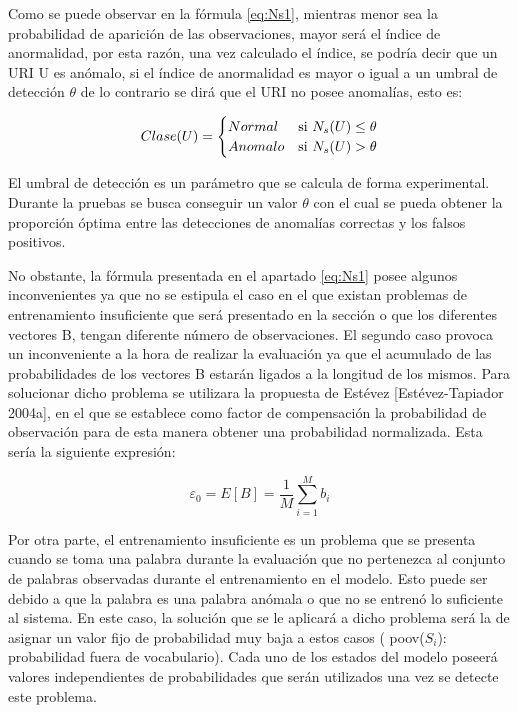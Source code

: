 Como se puede observar en la fórmula \ref{eq:Ns1}, mientras menor sea la probabilidad de aparición de las observaciones, mayor será el índice de anormalidad, por esta razón, una vez calculado el índice, se podría decir que un URI U es anómalo, si el índice de anormalidad es mayor o igual a un umbral de detección $\theta$ de lo contrario se dirá que el URI no posee anomalías, esto es:

\begin{equation}\label{eq:ClaseU}
Clase(U) = 
	\begin{cases} 
      Normal & $si $  N_{s}(U) \leq \theta \\
      Anomalo & $si $  N_{s}(U) > \theta \\ 
   \end{cases}
\end{equation}


El umbral de detección es un parámetro que se calcula de forma experimental. Durante la pruebas se busca conseguir un valor $\theta$ con el cual se pueda obtener la proporción óptima entre las detecciones de anomalías correctas y los falsos positivos. 

No obstante, la fórmula presentada en el apartado \ref{eq:Ns1} posee algunos inconvenientes ya que no se estipula el caso en el que existan problemas de entrenamiento insuficiente que será presentado en la sección o que los diferentes vectores B, tengan diferente número de observaciones. El segundo caso provoca un inconveniente a la hora de realizar la evaluación ya que el acumulado de las probabilidades de los vectores B estarán ligados a la longitud de los mismos. Para solucionar dicho problema se utilizara la propuesta de Estévez [Estévez-Tapiador 2004a], en el que se establece como factor de compensación la probabilidad de observación para de esta manera obtener una probabilidad normalizada. Esta sería la siguiente expresión:

\begin{equation}\label{eq:sumB}
\varepsilon_{0} = E[B] = \frac{1}{M}\sum_{i=1}^{M}b_{i}
\end{equation}

Por otra parte, el entrenamiento insuficiente es un problema que se presenta cuando se toma una palabra durante la evaluación que no pertenezca al conjunto de palabras observadas durante el entrenamiento en el modelo. Esto puede ser debido a que la palabra es una palabra anómala o que no se entrenó lo suficiente al sistema. En este caso, la solución que se le aplicará a dicho problema será la de asignar un valor fijo de probabilidad muy baja a estos casos ( poov($S_{i}$): probabilidad fuera de vocabulario). Cada uno de los estados del modelo poseerá valores independientes de probabilidades que serán utilizados una vez se detecte este problema.

